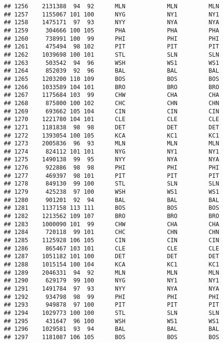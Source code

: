 \documentclass[]{article}
\begin{document}
\begin{verbatim}
## 1256    2131388  94  92      MLN            MLN         MLN
## 1257    1155067 101 100      NYG            NY1         NY1
## 1258    1475171  97  93      NYY            NYA         NYA
## 1259     304666 100 105      PHA            PHA         PHA
## 1260     738991 100  99      PHI            PHI         PHI
## 1261     475494  98 102      PIT            PIT         PIT
## 1262    1039698 100 101      STL            SLN         SLN
## 1263     503542  94  96      WSH            WS1         WS1
## 1264     852039  92  96      BAL            BAL         BAL
## 1265    1203200 110 109      BOS            BOS         BOS
## 1266    1033589 104 101      BRO            BRO         BRO
## 1267    1175684 103  99      CHW            CHA         CHA
## 1268     875800 100 102      CHC            CHN         CHN
## 1269     693662 105 104      CIN            CIN         CIN
## 1270    1221780 104 101      CLE            CLE         CLE
## 1271    1181838  98  98      DET            DET         DET
## 1272    1393054 100 105      KCA            KC1         KC1
## 1273    2005836  96  93      MLN            MLN         MLN
## 1274     824112 101 101      NYG            NY1         NY1
## 1275    1490138  99  95      NYY            NYA         NYA
## 1276     922886  98  98      PHI            PHI         PHI
## 1277     469397  98 101      PIT            PIT         PIT
## 1278     849130  99 100      STL            SLN         SLN
## 1279     425238  97 100      WSH            WS1         WS1
## 1280     901201  92  94      BAL            BAL         BAL
## 1281    1137158 113 111      BOS            BOS         BOS
## 1282    1213562 109 107      BRO            BRO         BRO
## 1283    1000090 101  99      CHW            CHA         CHA
## 1284     720118  99 101      CHC            CHN         CHN
## 1285    1125928 106 105      CIN            CIN         CIN
## 1286     865467 103 101      CLE            CLE         CLE
## 1287    1051182 101 100      DET            DET         DET
## 1288    1015154 100 104      KCA            KC1         KC1
## 1289    2046331  94  92      MLN            MLN         MLN
## 1290     629179  99 100      NYG            NY1         NY1
## 1291    1491784  97  93      NYY            NYA         NYA
## 1292     934798  98  99      PHI            PHI         PHI
## 1293     949878  97 100      PIT            PIT         PIT
## 1294    1029773 100 100      STL            SLN         SLN
## 1295     431647  96 100      WSH            WS1         WS1
## 1296    1029581  93  94      BAL            BAL         BAL
## 1297    1181087 106 105      BOS            BOS         BOS

\end{verbatim}
\end{document}
